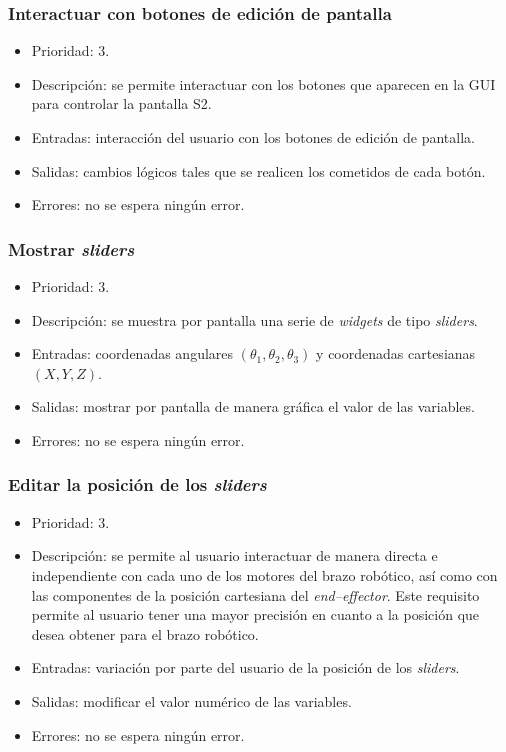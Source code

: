 \subsubsection{Interactuar con botones de edición de pantalla}
\begin{itemize}
    \item Prioridad: 3.
    \item Descripción: se permite interactuar con los botones que aparecen en la \ac{GUI} para controlar la pantalla \ac{S2}.
    \item Entradas: interacción del usuario con los botones de edición de pantalla.
    \item Salidas: cambios lógicos tales que se realicen los cometidos de cada botón.
    \item Errores: no se espera ningún error.
\end{itemize}

\subsubsection{Mostrar \textit{sliders}}
\begin{itemize}
    \item Prioridad: 3.
    \item Descripción: se muestra por pantalla una serie de \textit{widgets} de tipo \textit{sliders}.  
    \item Entradas: coordenadas angulares $\left(\theta_1, \theta_2, \theta_3\right)$ y coordenadas cartesianas $\left(X,Y,Z\right)$.
    \item Salidas: mostrar por pantalla de manera gráfica el valor de las variables.
    \item Errores: no se espera ningún error.
\end{itemize}

\subsubsection{Editar la posición de los \textit{sliders}}
\begin{itemize}
    \item Prioridad: 3.
    \item Descripción: se permite al usuario interactuar de manera directa e independiente con cada uno de los motores del brazo robótico, así como con las componentes de la posición cartesiana del \textit{end--effector}. Este requisito permite al usuario tener una mayor precisión en cuanto a la posición que desea obtener para el brazo robótico.
    \item Entradas: variación por parte del usuario de la posición de los \textit{sliders}.
    \item Salidas: modificar el valor numérico de las variables.
    \item Errores: no se espera ningún error.
\end{itemize}

